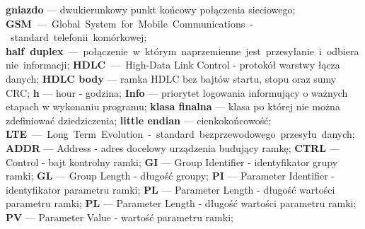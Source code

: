 \textbf{gniazdo} --- dwukierunkowy punkt końcowy połączenia sieciowego;\newline
\textbf{GSM} --- Global System for Mobile Communications - standard telefonii komórkowej;\newline
\textbf{half duplex} --- połączenie w którym naprzemienne jest przesyłanie i odbieranie informacji;\newline
\textbf{HDLC} --- High-Data Link Control - protokół warstwy łącza danych;\newline
\textbf{HDLC body} --- ramka HDLC bez bajtów startu, stopu oraz sumy CRC;\newline
\textbf{h} --- hour - godzina;\newline
\textbf{Info} --- priorytet logowania informujący o ważnych etapach w wykonaniu programu;\newline
\textbf{klasa finalna} --- klasa po której nie można zdefiniować dziedziczenia;\newline
\textbf{little endian} --- cienkokońcowość;\newline
\textbf{LTE} --- Long Term Evolution - standard bezprzewodowego przesyłu danych;\newline
\textbf{ADDR} --- Address - adres docelowy urządzenia budujący ramkę;\newline
\textbf{CTRL} --- Control - bajt kontrolny ramki;\newline
\textbf{GI} --- Group Identifier - identyfikator grupy ramki;\newline
\textbf{GL} --- Group Length - długość groupy;\newline
\textbf{PI} --- Parameter Identifier - identyfikator parametru ramki;\newline
\textbf{PL} --- Parameter Length - długość wartości parametru ramki;\newline
\textbf{PL} --- Parameter Length - długość wartości parametru ramki;\newline
\textbf{PV} --- Parameter Value - wartość parametru ramki;\newline

\newpage
